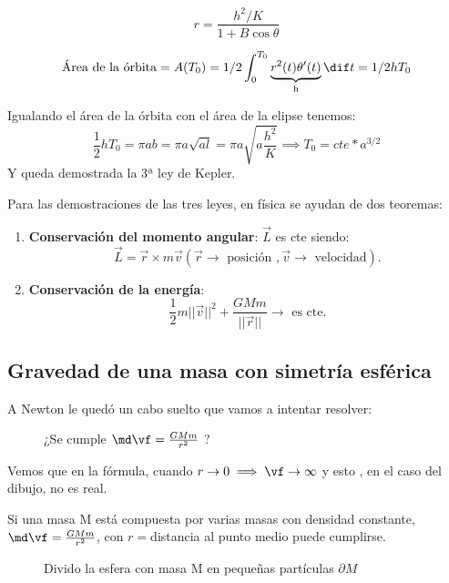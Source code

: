 $$r= \frac{h^2/K}{1 + B\cos\theta}$$

$$\text{Área de la órbita} = A(T_0) = 1/2 \int_0^{T_0} \underbrace{r^2(t)\theta'(t)}_{\text{h}}\dif t = 1/2hT_0$$

Igualando el área de la órbita con  el área de la elipse tenemos:
$$\frac{1}{2}hT_0 = \pi ab= \pi a \sqrt{al} = \pi a\sqrt{a\frac{h^2}{K}} \implies T_0 = cte*a^{3/2}$$
Y queda demostrada la 3ª ley de Kepler.

\obs Para las demostraciones de las tres leyes, en física se ayudan de dos teoremas:
\begin{enumerate}
\item\textbf{Conservación del momento angular}:
$\overrightarrow{L}$ es cte siendo:
\[\overrightarrow{L} = \overrightarrow{r} \times m \overrightarrow{v} (\overrightarrow{r} \rightarrow  \text{ posición },  \overrightarrow{v} \rightarrow \text{ velocidad}).\]


\item\textbf{Conservación de la energía}:\\
\[\frac{1}{2}m||\overrightarrow{v}||^2 + \frac{GMm}{||\overrightarrow{r}||} \rightarrow \text{ es cte}.\]
\end{enumerate}

\subsection{Gravedad de una masa con simetría esférica}
A Newton le quedó un cabo suelto que vamos a intentar resolver:

\begin{figure}[hbtp]
	\centering
	\caption{¿Se cumple $\md\vf = \frac{GMm}{r^2}$ ?}
\end{figure}
Vemos que en la fórmula, cuando $r \rightarrow 0 \implies \vf \rightarrow \infty$ y esto , en el caso del dibujo, no es real.

Si una masa M está compuesta por varias masas con densidad constante, $\md\vf = \frac{GMm}{r^2}$, con $r =$distancia al punto medio puede cumplirse.

\begin{figure}[hbtp]
\centering
{}
\caption{Divido la esfera con masa M en pequeñas partículas $\partial M$}
\label{figaaa}
\end{figure}

